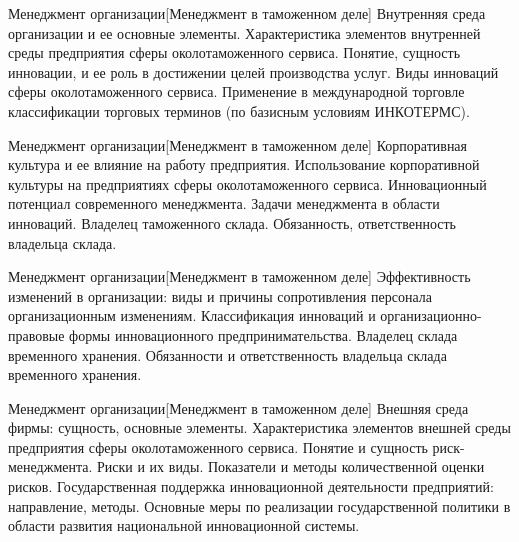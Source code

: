 \documentclass[
	11pt,
	a4paper,
	]
	{article}
\begin{document}
\begin{minipage}[t][\miniH]{\miniL}\centering
	 {Менеджмент организации}[Менеджмент в таможенном деле]
		{
			Внутренняя среда организации и ее основные элементы. Характеристика элементов внутренней среды предприятия сферы околотаможенного сервиса.
		}{
			Понятие, сущность инновации, и ее роль в достижении целей производства услуг. Виды инноваций сферы околотаможенного сервиса.
		}{
			Применение в международной торговле классификации торговых терминов (по базисным условиям ИНКОТЕРМС).
		}
	\lowGE
\end{minipage}

\vfill



\begin{minipage}[t][\miniH]{\miniL}\centering
	 {Менеджмент организации}[Менеджмент в таможенном деле]
		{
			Корпоративная культура и ее влияние на работу предприятия. Использование корпоративной культуры на предприятиях сферы околотаможенного сервиса.
		}{
			Инновационный потенциал современного менеджмента. Задачи менеджмента в области инноваций.
		}{
			Владелец таможенного склада. Обязанность, ответственность владельца склада.
		}
	\lowGE
\end{minipage}

\vfill



\begin{minipage}[t][\miniH]{\miniL}\centering
	 {Менеджмент организации}[Менеджмент в таможенном деле]
		{
			Эффективность изменений в организации: виды и причины сопротивления персонала организационным изменениям.
		}{
			Классификация инноваций и организационно-правовые формы инновационного предпринимательства.
		}{
			Владелец склада временного хранения. Обязанности и ответственность владельца склада временного хранения.
		}
	\lowGE
\end{minipage}





\begin{minipage}[t][\miniH]{\miniL}\centering
	 {Менеджмент организации}[Менеджмент в таможенном деле]
		{
			Внешняя среда фирмы: сущность, основные элементы. Характеристика элементов внешней среды предприятия сферы околотаможенного сервиса.
		}{
			Понятие и сущность риск-менеджмента. Риски и их виды. Показатели и методы количественной оценки рисков.
		}{
			Государственная поддержка инновационной деятельности предприятий: направление, методы. Основные меры по реализации государственной политики в области развития национальной инновационной системы.
		}
	\lowGE
\end{minipage}
\end{document}

